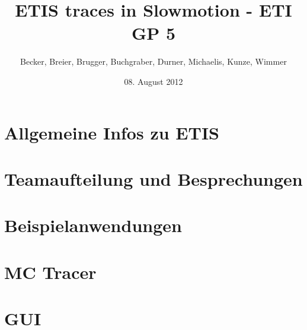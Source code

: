 \documentclass[10pt]{beamer}
\title[ETIS - ETI GP 5 - SS 2012]{ETIS traces in Slowmotion - ETI GP 5}
\author[Becker, Breier, Brugger, Buchgraber, Durner, Michaelis, Kunze, Wimmer]{Becker, Breier, Brugger, Buchgraber, Durner, Michaelis, Kunze, Wimmer}
\institute[TUM]{Technische Universität München}
\date[08.08.12]{08. August 2012}
\begin{document}
\begin{frame}
\titlepage
\end{frame}

\begin{frame}
\tableofcontents
\end{frame}


\section{Allgemeine Infos zu ETIS} 
\section{Teamaufteilung und Besprechungen} 
\section{Beispielanwendungen} 
\section{MC Tracer} 
\section{GUI} 
\end{document}
